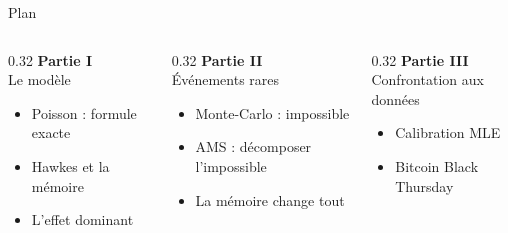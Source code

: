 \documentclass[aspectratio=169,10pt]{beamer}
\begin{document}
\begin{frame}{Plan}
  \vspace{4pt}
  \begin{columns}[t,onlytextwidth]
    \begin{column}{0.32\textwidth}
      \textcolor{bleu303}{\bfseries\small Partie I}\\
      \textcolor{bleu303}{\small Le modèle}
      \vspace{6pt}
      \begin{itemize}\itemsep6pt\small
        \item[\textcolor{marron871}{$\bullet$}] Poisson : formule exacte
        \item[\textcolor{marron871}{$\bullet$}] Hawkes et la mémoire
        \item[\textcolor{marron871}{$\bullet$}] L'effet dominant
      \end{itemize}
    \end{column}
    \begin{column}{0.32\textwidth}
      \textcolor{violet2622}{\bfseries\small Partie II}\\
      \textcolor{violet2622}{\small Événements rares}
      \vspace{6pt}
      \begin{itemize}\itemsep6pt\small
        \item[\textcolor{marron871}{$\bullet$}] Monte-Carlo : impossible
        \item[\textcolor{marron871}{$\bullet$}] AMS : décomposer l'impossible
        \item[\textcolor{marron871}{$\bullet$}] La mémoire change tout
      \end{itemize}
    \end{column}
    \begin{column}{0.32\textwidth}
      \textcolor{vert575}{\bfseries\small Partie III}\\
      \textcolor{vert575}{\small Confrontation aux données}
      \vspace{6pt}
      \begin{itemize}\itemsep6pt\small
        \item[\textcolor{marron871}{$\bullet$}] Calibration MLE
        \item[\textcolor{marron871}{$\bullet$}] Bitcoin Black Thursday
      \end{itemize}
    \end{column}
  \end{columns}

  
\end{frame}
\end{document}
